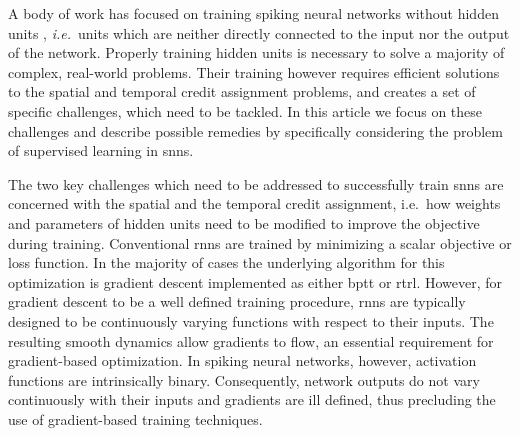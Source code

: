 \documentclass[journal,onecolumn,11pt]{IEEEtran}
\begin{document}
A body of work has focused on training spiking neural networks without
hidden units \cite{ponulak_supervised_2009, Gutig_Sompolinsky06_tempneur,
florian_chronotron:_2012, mohemmed_span:_2012, memmesheimer_learning_2014,
Anwani_Rajendran15_normappr},
\emph{i.e.}\ units which are neither directly connected to the input nor the output of
the network.  
Properly training hidden units is necessary to solve a majority of complex, real-world problems. Their training however requires efficient solutions to the spatial and temporal credit assignment problems, and creates a set of specific challenges, which need to be tackled.  In this article we focus on these
challenges and describe possible remedies by specifically considering the
problem of supervised learning in \glspl{snn}.

The two key challenges which need to be addressed to successfully train
\glspl{snn} are concerned with the spatial and the temporal credit assignment,
i.e.\ how weights and parameters of hidden units need to be modified to improve
the objective during training.  
Conventional \glspl{rnn} are trained by minimizing a scalar objective
or loss function. 
In the majority of cases the underlying algorithm for this optimization is 
gradient descent implemented as either \gls{bptt} or
\gls{rtrl}.
However, for gradient descent to be a well defined training procedure,
\glspl{rnn} are typically designed to be continuously varying functions with
respect to their inputs. 
The resulting smooth dynamics allow gradients to flow, %
an essential requirement for gradient-based optimization. 
In spiking neural networks, however, activation functions are intrinsically
binary. 
Consequently, network outputs do not vary continuously with their inputs and 
gradients are ill defined, 
thus precluding the use of gradient-based training techniques. 
\end{document}
